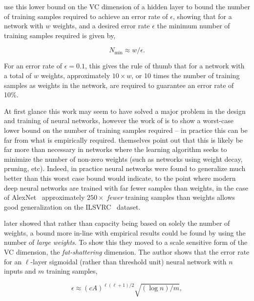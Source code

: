 \documentclass[thesis]{subfiles}
\begin{document}
    \citet{baum1989size} use this lower bound on the VC dimension of a hidden layer to bound the number of training samples required to achieve an error rate of $\epsilon$, showing that for a network with $w$ weights, and a desired error rate $\epsilon$ the minimum number of training samples required is given by,
    
    \begin{equation}
        N_{\min} \approx w/\epsilon.
    \end{equation}
    
    For an error rate of $\epsilon=0.1$, this gives the rule of thumb that for a network with a total of $w$ weights, approximately $10\times w$, or 10 times the number of training samples as weights in the network, are required to guarantee an error rate of 10\%. 
    
    At first glance this work may seem to have solved a major problem in the design and training of neural networks, however the work of \citet{baum1989size} is to show a worst-case lower bound on the number of training samples required -- in practice this can be far from what is empirically required. \citet{baum1989size} themselves point out that this is likely be far more than necessary in networks where the learning algorithm seeks to minimize the number of non-zero weights (such as networks using weight decay, pruning, etc). Indeed, in practice neural networks were found to generalize much better than this worst case bound would indicate, to the point where modern deep neural networks are trained with far fewer samples than weights, in the case of AlexNet~\citep{Krizhevsky2012} approximately $250\times$ \emph{fewer} training samples than weights allows good generalization on the ILSVRC~\citep{ILSVRC2015} dataset.
    
    \citet{bartlett1997} later showed that rather than capacity being based on solely the number of weights, a bound more in-line with empirical results could be found by using the number of \emph{large weights}. To show this they moved to a scale sensitive form of the VC dimension, the \emph{fat-shattering} dimension. The author shows that the error rate for an $\ell$-layer sigmoidal (rather than threshold unit) neural network with $n$ inputs and $m$ training samples,
    
    \begin{equation}
        \epsilon \approx (cA)^{\ell(\ell+1)/2} \sqrt{(\log n)/m},
    \end{equation}
    
\end{document}
